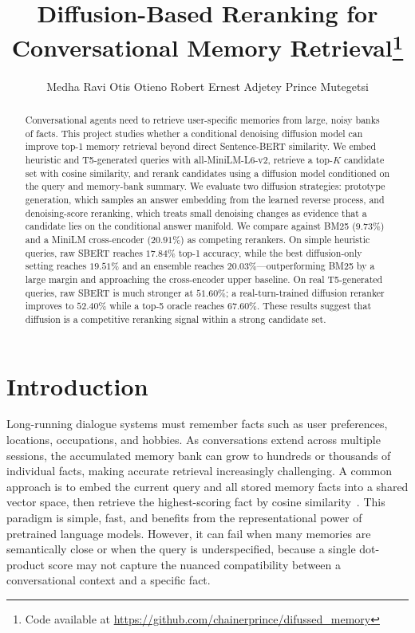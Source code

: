 \documentclass{article}
\title{Diffusion-Based Reranking for Conversational Memory Retrieval\thanks{Code available at \url{https://github.com/chainerprince/difussed_memory}}}
\author{
  Medha Ravi \And
  Otis Otieno Robert \And
  Ernest Adjetey \And
  Prince Mutegetsi
}
\begin{document}
\maketitle

\begin{abstract}
Conversational agents need to retrieve user-specific memories from large, noisy banks of facts. This project studies whether a conditional denoising diffusion model can improve top-1 memory retrieval beyond direct Sentence-BERT similarity. We embed heuristic and T5-generated queries with all-MiniLM-L6-v2, retrieve a top-$K$ candidate set with cosine similarity, and rerank candidates using a diffusion model conditioned on the query and memory-bank summary. We evaluate two diffusion strategies: prototype generation, which samples an answer embedding from the learned reverse process, and denoising-score reranking, which treats small denoising changes as evidence that a candidate lies on the conditional answer manifold. We compare against BM25 ($9.73\%$) and a MiniLM cross-encoder ($20.91\%$) as competing rerankers. On simple heuristic queries, raw SBERT reaches $17.84\%$ top-1 accuracy, while the best diffusion-only setting reaches $19.51\%$ and an ensemble reaches $20.03\%$---outperforming BM25 by a large margin and approaching the cross-encoder upper baseline. On real T5-generated queries, raw SBERT is much stronger at $51.60\%$; a real-turn-trained diffusion reranker improves to $52.40\%$ while a top-5 oracle reaches $67.60\%$. These results suggest that diffusion is a competitive reranking signal within a strong candidate set.
\end{abstract}

\section{Introduction}

Long-running dialogue systems must remember facts such as user preferences, locations, occupations, and hobbies. As conversations extend across multiple sessions, the accumulated memory bank can grow to hundreds or thousands of individual facts, making accurate retrieval increasingly challenging. A common approach is to embed the current query and all stored memory facts into a shared vector space, then retrieve the highest-scoring fact by cosine similarity~\cite{reimers2019sbert}. This paradigm is simple, fast, and benefits from the representational power of pretrained language models. However, it can fail when many memories are semantically close or when the query is underspecified, because a single dot-product score may not capture the nuanced compatibility between a conversational context and a specific fact.
\end{document}
